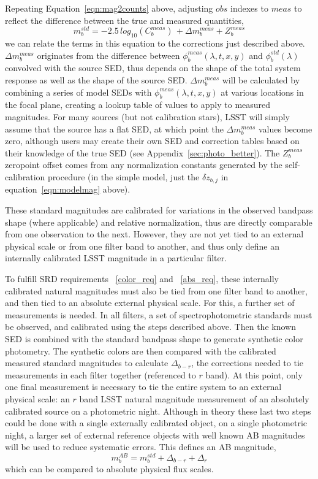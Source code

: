 \documentclass[12pt,preprint]{aastex}
\begin{document}
Repeating Equation~\ref{eqn:mag2counts} above, adjusting ${obs}$ indexes to ${meas}$ to 
reflect the difference between the true and measured quantities,
\begin{equation}
\label{eqn:magsFromCounts}
m_b^{std} = -2.5\,log_{10}(C_b^{meas}) \, + \Delta m_b^{meas} + Z_b^{meas} 
\end{equation}
we can relate the terms in this equation to the corrections just
described above.  $\Delta m_b^{meas}$ originates from the difference
between $\phi_b^{meas}(\lambda,t,x,y)$ and $\phi_b^{std}(\lambda)$
convolved with the source SED, thus depends on the shape of the total
system response as well as the shape of the source SED. $\Delta
m_b^{meas}$ will be calculated by combining a series of model SEDs
with $\phi_b^{meas}(\lambda,t,x,y)$ at various locations in the focal
plane, creating a lookup table of values to apply to measured
magnitudes.  For many sources (but not calibration stars), LSST will
simply assume that the source has a flat SED, at which point the
$\Delta m_b^{meas}$ values become zero, although users may create
their own SED and correction tables based on their knowledge of the
true SED (see Appendix~\ref{sec:photo_better}).  The $Z_b^{meas}$
zeropoint offset comes from any normalization constants generated by the 
self-calibration procedure (in the simple model, just the $\delta z_{b,j}$ in
equation~\ref{eqn:modelmag} above). 

These standard magnitudes are calibrated for variations in the
observed bandpass shape (where applicable) and relative normalization,
thus are directly comparable from one observation to the
next. However, they are not yet tied to an external physical scale or
from one filter band to another, and thus only define an internally
calibrated LSST magnitude in a particular filter.

To fulfill SRD requirements ~\ref{color_req} and ~\ref{abs_req}, these
internally calibrated natural magnitudes must also be tied from one filter
band to another, and then tied to an absolute external physical scale.
For this, a further set of measurements is needed. In all filters, a
set of spectrophotometric standards must be observed, and calibrated using
the steps described above. Then the known SED is combined with
the standard bandpass shape to generate synthetic color
photometry. The synthetic colors are then compared with the
calibrated measured standard magnitudes to calculate $\Delta_{b-r}$,
the corrections needed to tie measurements in each filter together
(referenced to $r$ band).  At this point, only one final measurement
is necessary to tie the entire system to an external physical scale:
an $r$ band LSST natural magnitude measurement of an absolutely
calibrated source on a photometric night. Although in theory these
last two steps could be done with a single externally calibrated
object, on a single photometric night, a larger set of external
reference objects with well known AB magnitudes will be used to reduce
systematic errors. This defines an AB magnitude,
\begin{equation}
\label{eqn:extmags}
m_b^{AB} = m_b^{std}  + \Delta_{b-r} + \Delta_r
\end{equation}
which can be compared to absolute physical flux scales. 
\end{document}
